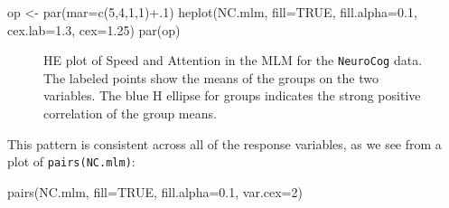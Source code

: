 \documentclass[
  letterpaper,
  10pt,
  krantz2]{krantz}
\makeatletter
\newenvironment{Shaded}{\begin{snugshade}}{\end{snugshade}}
\newcommand{\AttributeTok}[1]{\textcolor[rgb]{0.40,0.45,0.13}{#1}}
\newcommand{\ConstantTok}[1]{\textcolor[rgb]{0.56,0.35,0.01}{#1}}
\newcommand{\DecValTok}[1]{\textcolor[rgb]{0.68,0.00,0.00}{#1}}
\newcommand{\FloatTok}[1]{\textcolor[rgb]{0.68,0.00,0.00}{#1}}
\newcommand{\FunctionTok}[1]{\textcolor[rgb]{0.28,0.35,0.67}{#1}}
\newcommand{\NormalTok}[1]{\textcolor[rgb]{0.00,0.23,0.31}{#1}}
\newcommand{\OtherTok}[1]{\textcolor[rgb]{0.00,0.23,0.31}{#1}}
\newcommand{\SpecialCharTok}[1]{\textcolor[rgb]{0.37,0.37,0.37}{#1}}
\newenvironment{kframe}{%
  \medskip{}
  \setlength{\fboxsep}{.8em}
  \def\at@end@of@kframe{}%
  \ifinner\ifhmode%
  \def\at@end@of@kframe{\end{minipage}}%
  \begin{minipage}{\columnwidth}%
  \fi\fi%
  \def\FrameCommand##1{\hskip\@totalleftmargin \hskip-\fboxsep
  \colorbox{shadecolor}{##1}\hskip-\fboxsep
      \hskip-\linewidth \hskip-\@totalleftmargin \hskip\columnwidth}%
  \MakeFramed {\advance\hsize-\width
    \@totalleftmargin\z@ \linewidth\hsize
    \@setminipage}}%
{\par\unskip\endMakeFramed%
  \at@end@of@kframe}
\renewenvironment{Shaded}{\begin{kframe}}{\end{kframe}}
\makeatother
\begin{document}
\begin{Shaded}
\begin{Highlighting}[]
\NormalTok{op }\OtherTok{\textless{}{-}} \FunctionTok{par}\NormalTok{(}\AttributeTok{mar=}\FunctionTok{c}\NormalTok{(}\DecValTok{5}\NormalTok{,}\DecValTok{4}\NormalTok{,}\DecValTok{1}\NormalTok{,}\DecValTok{1}\NormalTok{)}\SpecialCharTok{+}\NormalTok{.}\DecValTok{1}\NormalTok{)}
\FunctionTok{heplot}\NormalTok{(NC.mlm, }
       \AttributeTok{fill=}\ConstantTok{TRUE}\NormalTok{, }\AttributeTok{fill.alpha=}\FloatTok{0.1}\NormalTok{,}
       \AttributeTok{cex.lab=}\FloatTok{1.3}\NormalTok{, }\AttributeTok{cex=}\FloatTok{1.25}\NormalTok{)}
\FunctionTok{par}\NormalTok{(op)}
\end{Highlighting}
\end{Shaded}

\begin{figure}[H]


\caption{\label{fig-NC-HEplot}HE plot of Speed and Attention in the MLM
for the \texttt{NeuroCog} data. The labeled points show the means of the
groups on the two variables. The blue H ellipse for groups indicates the
strong positive correlation of the group means.}

\end{figure}%

This pattern is consistent across all of the response variables, as we
see from a plot of \texttt{pairs(NC.mlm)}:

\begin{Shaded}
\begin{Highlighting}[]
\FunctionTok{pairs}\NormalTok{(NC.mlm, }
      \AttributeTok{fill=}\ConstantTok{TRUE}\NormalTok{, }\AttributeTok{fill.alpha=}\FloatTok{0.1}\NormalTok{,}
      \AttributeTok{var.cex=}\DecValTok{2}\NormalTok{)}
\end{Highlighting}
\end{Shaded}
\end{document}
